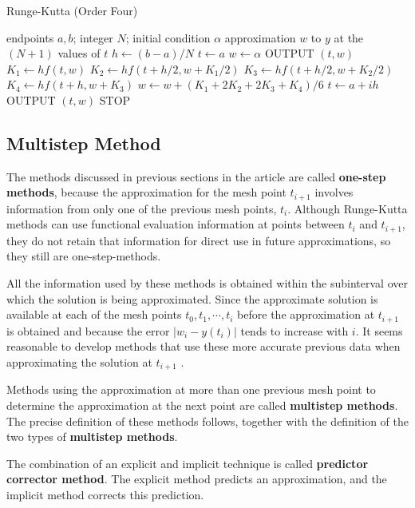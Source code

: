 \documentclass[preprint,12pt]{elsarticle}
\begin{document}
\begin{algorithm}
  \caption{Runge-Kutta (Order Four)}
  \label{algo:runge_kutta}
  \begin{algorithmic}[1]
  \Require endpoints $a,b$; integer $N$; initial condition $\alpha$
  \Ensure approximation $w$ to $y$ at the $(N+1)$ values of $t$
  \State $h\gets (b-a)/N$
  \State $t\gets a$
  \State $w\gets \alpha$
  \State OUTPUT $(t,w)$
    \State $K_1 \gets hf(t,w)$
    \State $K_2 \gets hf(t+h/2 ,w+K_1 / 2)$
    \State $K_3 \gets hf(t+h/2 ,w+K_2 / 2)$
    \State $K_4 \gets hf(t+h,w+K_3)$
    \State $w\gets w+(K_{1}+2K_{2}+2K_{3}+K_4)/6$
    \State $t\gets a+ih$
    \State OUTPUT $(t,w)$
  \EndFor
  \State STOP
  \end{algorithmic}
\end{algorithm}


\subsection{Multistep Method}
\label{SS:2.2}

The methods discussed in previous sections in the article are called \textbf{one-step methods}, because the approximation for the mesh point $t_{i+1}$ involves information from only one of the previous mesh points, $t_i$. Although Runge-Kutta methods can use functional evaluation information at points between $t_i$ and $t_{i+1}$, they do not retain that information for direct use in future approximations, so they still are one-step-methods.

All the information used by these methods is obtained within the subinterval over which the solution is being approximated. Since the approximate solution is available at each of the mesh points $t_0,t_1,\cdots,t_i$ before the approximation at $t_{i+1}$ is obtained and because the error $|w_i - y(t_i)|$ tends to increase with $i$. It seems reasonable to develop methods that use these more accurate previous data when approximating the solution at $t_{i+1}$ .

Methods using the approximation at more than one previous mesh point to determine the approximation at the next point are called \textbf{multistep methods}. The precise definition of these methods follows, together with the definition of the two types of \textbf{multistep methods}.

The combination of an explicit and implicit technique is called \textbf{predictor corrector method}. The explicit method predicts an approximation, and the implicit method corrects this prediction.
\end{document}
